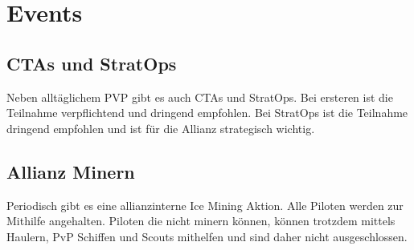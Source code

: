 \section{Events}

\subsection{CTAs und StratOps}

Neben alltäglichem PVP gibt es auch CTAs und StratOps. Bei ersteren ist die Teilnahme verpflichtend und dringend empfohlen. Bei StratOps ist die Teilnahme dringend empfohlen und ist für die Allianz strategisch wichtig.

\subsection{Allianz Minern}

Periodisch gibt es eine allianzinterne Ice Mining Aktion. Alle Piloten werden zur Mithilfe angehalten. Piloten die nicht minern können, können trotzdem mittels Haulern, PvP Schiffen und Scouts mithelfen und sind daher nicht ausgeschlossen.